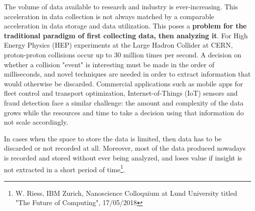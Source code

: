 \vspace{-2mm}

The volume of data available to research and industry is ever-increasing. 
This acceleration in data collection is not always matched by a comparable acceleration in data storage and data utilization. 
This poses a \textbf{problem for the traditional paradigm of first collecting data, then analyzing it}. 
For High Energy Physics (HEP) experiments at the Large Hadron Collider at CERN, proton-proton collisions occur up to 30 million times per second. A decision on whether a collision "event" is interesting must be made in the order of milliseconds, and novel techniques are needed in order to extract information that would otherwise be discarded. Commercial applications such as mobile apps for fleet control and transport optimization, Internet-of-Things (IoT) sensors and fraud detection face a similar challenge: the amount and complexity of the data grows while the resources and time to take a decision using that information do not scale accordingly.

In cases when the space to store the data is limited, then data has to be discarded or not recorded at all. 
Moreover, most of the data produced nowadays is recorded and stored without ever being analyzed, and loses value if insight is not extracted in a short period of time\footnote{W. Riess, IBM Zurich, Nanoscience Colloquium at Lund University titled "The Future of Computing", 17/05/2018}. 

